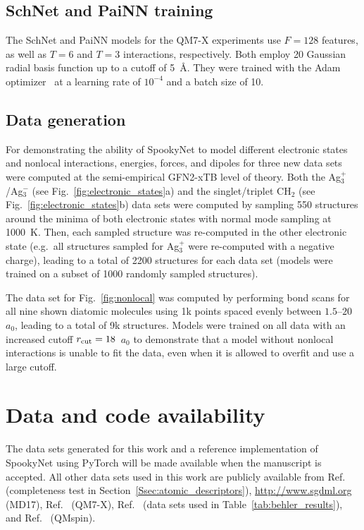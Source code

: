\documentclass[%
superscriptaddress,
reprint,
nofootinbib,
amsmath,amssymb,amsfonts,
floatfix,
altaffilletter,
showkeys,
]{revtex4-2}
\newcommand{\nn}{SpookyNet}
\begin{document}
\subsection*{SchNet and PaiNN training}
The SchNet and PaiNN models for the QM7-X experiments use $F=128$ features, as well as $T=6$ and $T=3$ interactions, respectively.
Both employ 20 Gaussian radial basis function up to a cutoff of 5~\AA. They were trained with the Adam optimizer~\cite{kingma2014adam} at a learning rate of $10^{-4}$ and a batch size of 10.\\

\subsection*{Data generation}
For demonstrating the ability of \nn{} to model different electronic states and nonlocal interactions, energies, forces, and dipoles for three new data sets were computed at the semi-empirical GFN2-xTB level of theory.\cite{bannwarth2019gfn2} Both the Ag$_3^+$/Ag$_3^-$ (see Fig.~\ref{fig:electronic_states}a) and the singlet/triplet CH$_2$ (see Fig.~\ref{fig:electronic_states}b) data sets were computed by sampling 550 structures around the minima of both electronic states with normal mode sampling\cite{smith2017ani} at 1000~K. Then, each sampled structure was re-computed in the other electronic state (e.g.\ all structures sampled for Ag$_3^+$ were re-computed with a negative charge), leading to a total of 2200 structures for each data set (models were trained on a subset of 1000 randomly sampled structures).

The data set for Fig.~\ref{fig:nonlocal} was computed by performing bond scans for all nine shown diatomic molecules using 1k points spaced evenly between $1.5$--$20$~$a_0$, leading to a total of 9k structures. Models were trained on all data with an increased cutoff  $r_{\rm cut} = 18$~$a_0$ to demonstrate that a model without nonlocal interactions is unable to fit the data, even when it is allowed to overfit and use a large cutoff.\\


\section*{Data and code availability}
The data sets generated for this work and a reference implementation of \nn{} using PyTorch\cite{paszke2019pytorch} will be made available when the manuscript is accepted. All other data sets used in this work are publicly available from Ref.~ (completeness test in Section~\ref{Ssec:atomic_descriptors}), \url{http://www.sgdml.org} (MD17),  Ref.~ (QM7-X), Ref.~ (data sets used in Table~\ref{tab:behler_results}), and Ref.~ (QMspin).
\end{document}
